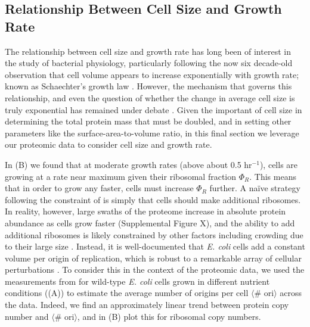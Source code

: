 
\subsection{Relationship Between Cell Size and Growth Rate}
The relationship
between cell size and growth rate has long been of interest in the study of
bacterial physiology, particularly following the now six decade-old observation
that cell volume appears to increase exponentially with growth rate; known as
Schaechter's growth law  \citep{schaechter1958, taheriaraghi2015}. However, the
mechanism that governs this relationship, and even the question of whether the
change in average cell size is truly exponential has remained under debate
\citep{harris2018}. Given the important of cell size in determining the total
protein mass that must be doubled, and in setting other parameters like the
surface-area-to-volume ratio, in this final section we leverage our proteomic
data to consider cell size and growth rate.

In (B) we found that at moderate growth rates (above about
0.5 hr$^{-1}$), cells are growing at a rate near maximum given their ribosomal
fraction $\Phi_R$. This means that in order to grow any faster, cells must
increase $\Phi_R$ further. A na\"ive strategy following the constraint of
 is simply that cells should make additional  ribosomes. In reality, however, large swaths of the proteome
increase in absolute protein abundance as cells grow faster (Supplemental Figure
X), and the ability to add additional ribosomes is likely constrained by other
factors including crowding due to their large size \citep{delarue2018,
solerbistue2020}. Instead, it is well-documented that \textit{E. coli} cells add
a constant volume per origin of replication,
which is robust to a remarkable array of cellular perturbations \citep{si2017}.
To consider this in the context of the proteomic data, we used the measurements from
\cite{si2017} for wild-type \textit{E. coli} cells grown in different nutrient conditions
((A)) to estimate the average number of origins per cell $\langle$\# ori$\rangle$ across the data. Indeed, we find an approximately linear trend between protein
copy number and $\langle$\# ori$\rangle$, and in (B) plot
this for ribosomal copy numbers.

